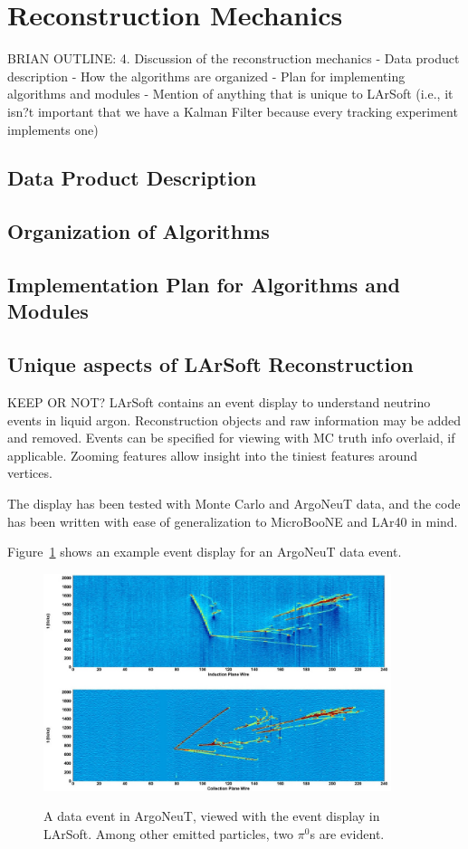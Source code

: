 \documentclass[12pt]{elsarticle}
\begin{document}
\section{Reconstruction Mechanics}

BRIAN OUTLINE: 4. Discussion of the reconstruction mechanics
- Data product description
- How the algorithms are organized
- Plan for implementing algorithms and modules
- Mention of anything that is unique to LArSoft (i.e., it isn?t important that we have a Kalman Filter because every tracking experiment implements one)

\subsection{Data Product Description}
\subsection{Organization of Algorithms}
\subsection{Implementation Plan for Algorithms and Modules}
\subsection{Unique aspects of LArSoft Reconstruction}

KEEP OR NOT?
LArSoft contains an event display to understand neutrino events in liquid argon. Reconstruction objects and raw information may be added and removed. Events can be specified for viewing with MC truth info overlaid, if applicable. Zooming features allow insight into the tiniest features around vertices.

The display has been tested with Monte Carlo and ArgoNeuT data, and the code has been written with ease of generalization to MicroBooNE and LAr40 in mind.  

Figure~\ref{argo.evd} shows an example event display for an ArgoNeuT data event.

\hspace*{2cm}
\begin{figure}[h]
\centering
\caption{A data event in ArgoNeuT, viewed with the event display in LArSoft. Among other emitted particles, two $\pi^0$s are evident.}
\includegraphics[width=4.0in]{./mtrls/imgs/ArgoNeuT_event.jpg}
\label{argo.evd}
\end{figure}
\end{document}
